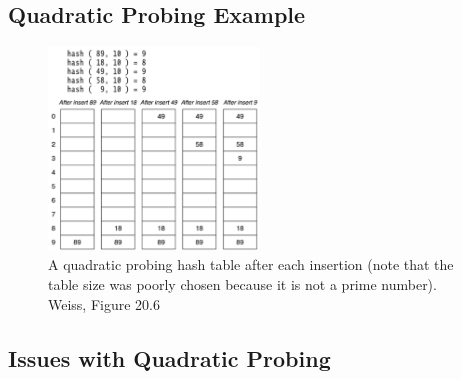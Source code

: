 \documentclass[
  10pt,
  english,
  letterpaper,
,tablecaptionabove
]{scrartcl}
\begin{document}
\hypertarget{quadratic-probing-example}{%
\subsection{Quadratic Probing Example}\label{quadratic-probing-example}}

\begin{figure}
\centering
\includegraphics[width=0.5\textwidth,height=\textheight]{images/5.png}
\caption{A quadratic probing hash table after each insertion (note that
the table size was poorly chosen because it is not a prime number).
Weiss, Figure 20.6}
\end{figure}

\hypertarget{issues-with-quadratic-probing}{%
\subsection{Issues with Quadratic
Probing}\label{issues-with-quadratic-probing}}
\end{document}
